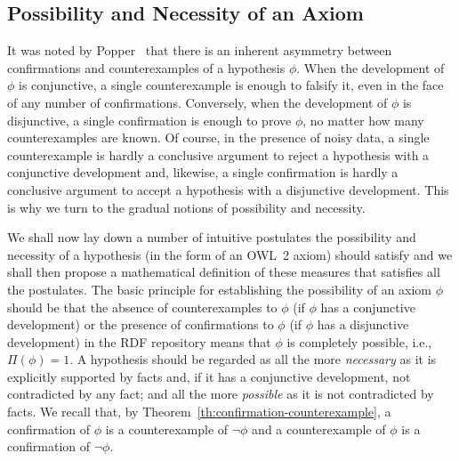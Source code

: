\documentclass[review]{elsarticle}
\theoremstyle{definition}
\begin{document}
\subsection{Possibility and Necessity of an Axiom}

It was noted by Popper~\cite{Popper1935} that there is an inherent asymmetry
between confirmations and counterexamples of a hypothesis $\phi$.
When the development of $\phi$ is conjunctive, a single counterexample is
enough to falsify it, even in the face of any number of confirmations.
Conversely, when the development of $\phi$ is disjunctive, a single
confirmation is enough to prove $\phi$, no matter how many counterexamples
are known. Of course, in the presence of noisy data, a single counterexample
is hardly a conclusive argument to reject a hypothesis with a conjunctive
development and, likewise, a single confirmation is hardly a conclusive
argument to accept a hypothesis with a disjunctive development.
This is why we turn to the gradual notions of possibility and necessity.

We shall now lay down a number of intuitive postulates the possibility and
necessity of a hypothesis (in the form of an OWL~2 axiom) should satisfy
and we shall then propose a mathematical definition of these measures
that satisfies all the postulates.
The basic principle for establishing the possibility of an axiom $\phi$
should be that the absence of counterexamples to $\phi$
(if $\phi$ has a conjunctive development)
or the presence of confirmations to $\phi$
(if $\phi$ has a disjunctive development)
in the RDF repository means that $\phi$ is completely possible, i.e., $\Pi(\phi) = 1$.
A hypothesis should be regarded as all the more
\emph{necessary} as it is explicitly supported by facts and, if it has a conjunctive development, not contradicted by any fact;
and all the more \emph{possible} as it is not contradicted by facts.
We recall that, by Theorem~\ref{th:confirmation-counterexample},
a confirmation of $\phi$ is a counterexample of $\neg\phi$
and a counterexample of $\phi$ is a confirmation of $\neg\phi$.
\end{document}

